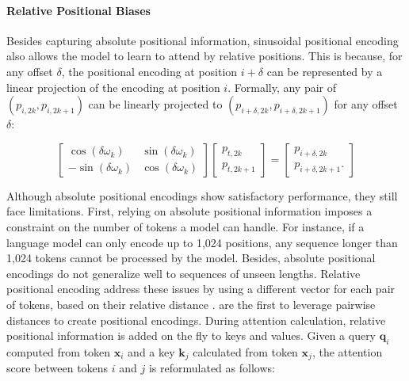 \paragraph{Relative Positional Biases} Besides capturing absolute positional information, sinusoidal positional encoding also allows the model to learn to attend by relative positions. This is because, for any offset $\delta$, the positional encoding at position $i + \delta$ can be represented by a linear projection of the encoding at position $i$. Formally, any pair of $(p_{i, 2k}, p_{i, 2k+1})$ can be linearly projected to $(p_{i + \delta, 2k}, p_{i + \delta, 2k+1})$ for any offset $\delta$:

\begin{equation}
    \begin{bmatrix}
        \cos(\delta \omega_k)  & \sin(\delta \omega_k) \\
        -\sin(\delta \omega_k) & \cos(\delta \omega_k)
    \end{bmatrix}
    \begin{bmatrix}
        p_{t, 2k}   \\
        p_{t, 2k+1}
    \end{bmatrix}
    = \begin{bmatrix}
        p_{i + \delta, 2k}   \\
        p_{i + \delta, 2k+1}.
    \end{bmatrix}
\end{equation}

Although absolute positional encodings show satisfactory performance, they still face limitations. First, relying on absolute positional information imposes a constraint on the number of tokens a model can handle. For instance, if a language model can only encode up to 1,024 positions, any sequence longer than 1,024 tokens cannot be processed by the model. Besides, absolute positional encodings do not generalize well to sequences of unseen lengths. Relative positional encoding address these issues by using a different vector for each pair of tokens, based on their relative distance \citep{shaw2018self, huang2018music, ke2020rethinking}.  \citet{shaw2018self} are the first to leverage pairwise distances to create positional encodings. During attention calculation, relative positional information is added on the fly to keys and values. Given a query $\bm{q}_i$ computed from token $\bm{x}_i$ and a key $\bm{k}_j$ calculated from token $\bm{x}_j$, the attention score between tokens $i$ and $j$ is reformulated as follows:

